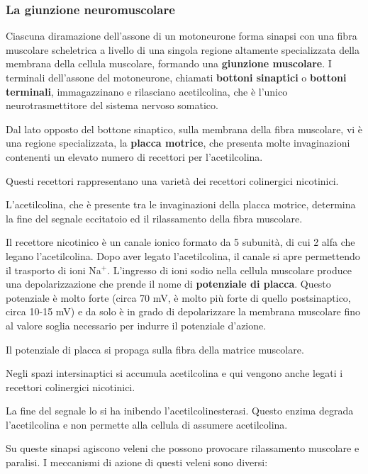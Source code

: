 \documentclass[]{article}
\begin{document}
\subsubsection{La giunzione
neuromuscolare}\label{la-giunzione-neuromuscolare}

Ciascuna diramazione dell'assone di un motoneurone forma sinapsi con una
fibra muscolare scheletrica a livello di una singola regione altamente
specializzata della membrana della cellula muscolare, formando una
\textbf{giunzione muscolare}. I terminali dell'assone del motoneurone,
chiamati \textbf{bottoni sinaptici} o \textbf{bottoni terminali},
immagazzinano e rilasciano acetilcolina, che è l'unico
neurotrasmettitore del sistema nervoso somatico.

Dal lato opposto del bottone sinaptico, sulla membrana della fibra
muscolare, vi è una regione specializzata, la \textbf{placca motrice},
che presenta molte invaginazioni contenenti un elevato numero di
recettori per l'acetilcolina.

Questi recettori rappresentano una varietà dei recettori colinergici
nicotinici.

L'acetilcolina, che è presente tra le invaginazioni della placca
motrice, determina la fine del segnale eccitatoio ed il rilassamento
della fibra muscolare.

Il recettore nicotinico è un canale ionico formato da 5 subunità, di cui
2 alfa che legano l'acetilcolina. Dopo aver legato l'acetilcolina, il
canale si apre permettendo il trasporto di ioni Na\(^+\). L'ingresso di
ioni sodio nella cellula muscolare produce una depolarizzazione che
prende il nome di \textbf{potenziale di placca}. Questo potenziale è
molto forte (circa 70 mV, è molto più forte di quello postsinaptico,
circa 10-15 mV) e da solo è in grado di depolarizzare la membrana
muscolare fino al valore soglia necessario per indurre il potenziale
d'azione.

Il potenziale di placca si propaga sulla fibra della matrice muscolare.

Negli spazi intersinaptici si accumula acetilcolina e qui vengono anche
legati i recettori colinergici nicotinici.

La fine del segnale lo si ha inibendo l'acetilcolinesterasi. Questo
enzima degrada l'acetilcolina e non permette alla cellula di assumere
acetilcolina.

Su queste sinapsi agiscono veleni che possono provocare rilassamento
muscolare e paralisi. I meccanismi di azione di questi veleni sono
diversi:
\end{document}
